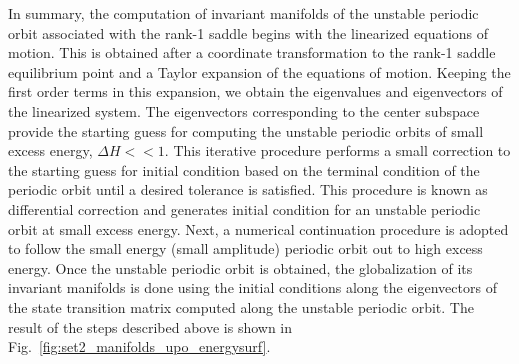 \documentclass{ws-ijbc}
\begin{document}
In summary, the computation of invariant manifolds of the unstable periodic orbit associated with the rank-1 saddle begins with the linearized equations of motion. This is obtained after a coordinate transformation to the rank-1 saddle equilibrium point and a Taylor expansion of the equations of motion. Keeping the first order terms in this expansion, we obtain the eigenvalues and eigenvectors of the linearized system. The eigenvectors corresponding to the center subspace provide the starting guess for computing the unstable periodic orbits of small excess energy, $\Delta H << 1$. This iterative procedure performs a small correction to the starting guess for initial condition based on the terminal condition of the periodic orbit until a desired tolerance is satisfied. This procedure is known as differential correction and generates initial condition for an unstable periodic orbit at small excess energy. Next, a numerical continuation procedure is adopted to follow the small energy (small amplitude) periodic orbit out to high excess energy. Once the unstable periodic orbit is obtained, the globalization of its invariant manifolds is done using the initial conditions along the eigenvectors of the state transition matrix computed along the unstable periodic orbit. The result of the steps described above is shown in Fig.~\ref{fig:set2_manifolds_upo_energysurf}.
\end{document}
